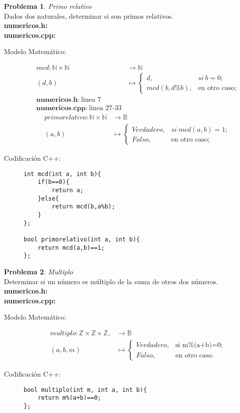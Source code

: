 \documentclass{article}
\theoremstyle{plain}
\theoremstyle{definition}
\newtheorem{problem}{Problema}
\begin{document}
\begin{problem} \emph{Primo relativo}\\
Dados dos naturales, determinar si son primos relativos.\\
\textbf{numericos.h:}\ \\
\textbf{numericos.cpp:}\ 
%
\begin{description}
\item[Modelo Matemático:]
%
\begin{align*}
mcd: \mathbb{N}\times\mathbb{N} &\to \mathbb{N}\\
(d,b) &\mapsto
\begin{cases}
d,& si\ b=0;\\
mcd(b,d\%b),& \text{en otro caso;}
\end{cases}\\
\textbf{numericos.h:}\ \text{linea 7}\\
\textbf{numericos.cpp:}\ \text{linea 27-33}
\end{align*}
\begin{align*}
primo relativo: \mathbb{N}\times\mathbb{N} &\to \mathbb{B}\\
(a,b) &\mapsto 
\begin{cases}
Verdadero,& si\ mcd(a,b)=1;\\
Falso,& \text{en otro caso;}
\end{cases}
\end{align*}
%
\item[Codificación \textsf{C++}:]\hfill
%
\begin{verbatim}
int mcd(int a, int b){
    if(b==0){
        return a;
    }else{
        return mcd(b,a%b);
    }
};

bool primorelativo(int a, int b){
    return mcd(a,b)==1;
};
\end{verbatim}
\end{description}
\end{problem}

\begin{problem} \emph{Multiplo}\\
Determinar si un número es múltiplo de la suma de otros dos números.\\
\textbf{numericos.h:}\ \\
\textbf{numericos.cpp:}\ 
%
\begin{description}
\item[Modelo Matemático:]
%
\begin{align*}
multiplo: \mathbb{Z}\times\mathbb{Z}\times\mathbb{Z},&\to \mathbb{B}\\
(a,b,m) &\mapsto 
\begin{cases}
Verdadero,& \text{si m\%(a+b)=0;}\\
Falso,& \text{en otro caso.}
\end{cases}
\end{align*}
%
\item[Codificación \textsf{C++}:]\hfill
%
\begin{verbatim}
bool multiplo(int m, int a, int b){
    return m%(a+b)==0;
};
\end{verbatim}
\end{description}
\end{problem}
\end{document}
